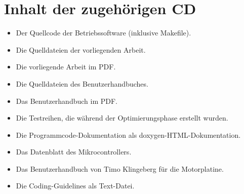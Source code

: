 \chapter{Inhalt der zugehörigen CD}
\begin{itemize}
	\item Der Quellcode der Betriebssoftware (inklusive Makefile).
	\item Die Quelldateien der vorliegenden Arbeit.
	\item Die vorliegende Arbeit im PDF.
	\item Die Quelldateien des Benutzerhandbuches.
	\item Das Benutzerhandbuch im PDF.
	\item Die Testreihen, die während der Optimierungsphase erstellt wurden.
	\item Die Programmcode-Dokumentation als doxygen-HTML-Dokumentation.
	\item Das Datenblatt des Mikrocontrollers.
	\item Das Benutzerhandbuch von Timo Klingeberg für die Motorplatine.
	\item Die Coding-Guidelines als Text-Datei.
\end{itemize}
